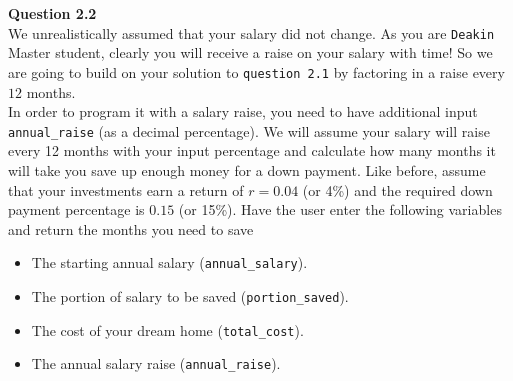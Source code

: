 \documentclass[a4paper]{article}
\begin{document}
\begin{answer}
    \textbf{Question 2.2} \\

    We unrealistically assumed that your salary did not change.
    As you are \texttt{Deakin} Master student, clearly you will receive a raise on your salary with time! So we are going to build on your solution to \texttt{question 2.1} by factoring in a raise every $12$ months.\\

    In order to program it with a salary raise, you need to have additional input \texttt{annual_raise} (as a decimal percentage).
    We will assume your salary will raise every 12 months with your input percentage and calculate how many months it will take you save up enough money for a down payment. Like before, assume that your investments earn a return of $r = 0.04$ (or 4\%) and the required down payment percentage is $0.15$ (or 15\%). Have the user enter the following variables and return the months you need to save \\

    \begin{itemize}
        \item The starting annual salary (\texttt{annual_salary}).
        \item The portion of salary to be saved (\texttt{portion_saved}).
        \item The cost of your dream home (\texttt{total_cost}).
        \item The annual salary raise (\texttt{annual_raise}).
    \end{itemize}

    \end{answer}
\end{document}
